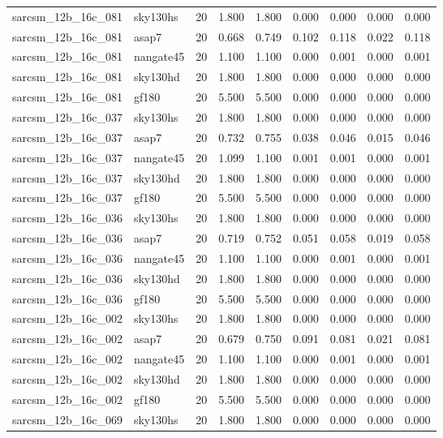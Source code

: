 \begin{tabular}{llrrrrrrr}
sarcsm\_12b\_16c\_081 & sky130hs & 20 & 1.800 & 1.800 & 0.000 & 0.000 & 0.000 & 0.000 \\
sarcsm\_12b\_16c\_081 & asap7 & 20 & 0.668 & 0.749 & 0.102 & 0.118 & 0.022 & 0.118 \\
sarcsm\_12b\_16c\_081 & nangate45 & 20 & 1.100 & 1.100 & 0.000 & 0.001 & 0.000 & 0.001 \\
sarcsm\_12b\_16c\_081 & sky130hd & 20 & 1.800 & 1.800 & 0.000 & 0.000 & 0.000 & 0.000 \\
sarcsm\_12b\_16c\_081 & gf180 & 20 & 5.500 & 5.500 & 0.000 & 0.000 & 0.000 & 0.000 \\
sarcsm\_12b\_16c\_037 & sky130hs & 20 & 1.800 & 1.800 & 0.000 & 0.000 & 0.000 & 0.000 \\
sarcsm\_12b\_16c\_037 & asap7 & 20 & 0.732 & 0.755 & 0.038 & 0.046 & 0.015 & 0.046 \\
sarcsm\_12b\_16c\_037 & nangate45 & 20 & 1.099 & 1.100 & 0.001 & 0.001 & 0.000 & 0.001 \\
sarcsm\_12b\_16c\_037 & sky130hd & 20 & 1.800 & 1.800 & 0.000 & 0.000 & 0.000 & 0.000 \\
sarcsm\_12b\_16c\_037 & gf180 & 20 & 5.500 & 5.500 & 0.000 & 0.000 & 0.000 & 0.000 \\
sarcsm\_12b\_16c\_036 & sky130hs & 20 & 1.800 & 1.800 & 0.000 & 0.000 & 0.000 & 0.000 \\
sarcsm\_12b\_16c\_036 & asap7 & 20 & 0.719 & 0.752 & 0.051 & 0.058 & 0.019 & 0.058 \\
sarcsm\_12b\_16c\_036 & nangate45 & 20 & 1.100 & 1.100 & 0.000 & 0.001 & 0.000 & 0.001 \\
sarcsm\_12b\_16c\_036 & sky130hd & 20 & 1.800 & 1.800 & 0.000 & 0.000 & 0.000 & 0.000 \\
sarcsm\_12b\_16c\_036 & gf180 & 20 & 5.500 & 5.500 & 0.000 & 0.000 & 0.000 & 0.000 \\
sarcsm\_12b\_16c\_002 & sky130hs & 20 & 1.800 & 1.800 & 0.000 & 0.000 & 0.000 & 0.000 \\
sarcsm\_12b\_16c\_002 & asap7 & 20 & 0.679 & 0.750 & 0.091 & 0.081 & 0.021 & 0.081 \\
sarcsm\_12b\_16c\_002 & nangate45 & 20 & 1.100 & 1.100 & 0.000 & 0.001 & 0.000 & 0.001 \\
sarcsm\_12b\_16c\_002 & sky130hd & 20 & 1.800 & 1.800 & 0.000 & 0.000 & 0.000 & 0.000 \\
sarcsm\_12b\_16c\_002 & gf180 & 20 & 5.500 & 5.500 & 0.000 & 0.000 & 0.000 & 0.000 \\
sarcsm\_12b\_16c\_069 & sky130hs & 20 & 1.800 & 1.800 & 0.000 & 0.000 & 0.000 & 0.000 \\

\end{tabular}
